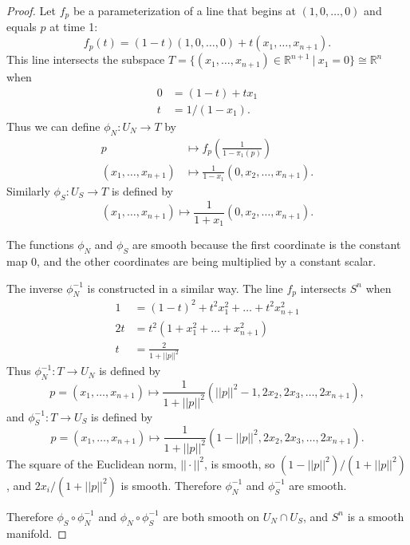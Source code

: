\documentclass{article}
\begin{document}
\begin{proof}
  Let $f_p$ be a parameterization of a line that begins at $(1, 0, \hdots, 0)$ and
  equals $p$ at time 1: \[
    f_p(t) = (1 - t)(1, 0, \hdots, 0) + t(x_1, \hdots, x_{n + 1}).
  \]
  This line intersects the subspace
  $T = \{ (x_1, \hdots, x_{n + 1}) \in \mathbb{R}^{n + 1}\ |\ x_1 = 0\} \cong \mathbb{R}^n$
  when \begin{align*}
    0 &= (1 - t) + tx_1 \\
    t &= 1/(1 - x_1).
  \end{align*}
  Thus we can define $\phi_N: U_N \rightarrow T$ by \begin{align*}
    p &\mapsto f_p\left(\frac{1}{1-\pi_1(p)}\right) \\
    (x_1, \hdots, x_{n + 1}) &\mapsto \frac{1}{1-x_1}(0, x_2, \hdots, x_{n + 1}).
  \end{align*}
  Similarly $\phi_S: U_S \rightarrow T$ is defined by \[
    (x_1, \hdots, x_{n + 1}) \mapsto \frac{1}{1+x_1}(0, x_2, \hdots, x_{n + 1}).
  \]

  The functions $\phi_N$ and $\phi_S$ are smooth because the first coordinate is the
  constant map $0$, and the other coordinates are being multiplied by a constant scalar.

  The inverse $\phi_N^{-1}$ is constructed in a similar way. The line $f_p$
  intersects $S^n$ when \begin{align*}
    1 &= (1 - t)^2 + t^2x_1^2 + \hdots + t^2x_{n + 1}^2 \\
    2t &= t^2(1 + x_1^2 + \hdots + x_{n + 1}^2) \\
    t &= \frac{2}{1 + ||p||^2}
  \end{align*}
  Thus $\phi_N^{-1}: T \rightarrow U_N$ is defined by \[
    p = (x_1, \hdots, x_{n + 1}) \mapsto \frac{1}{1 + ||p||^2}(||p||^2 - 1, 2x_2, 2x_3, \hdots, 2x_{n + 1}),
  \]
  and $\phi_S^{-1}: T \rightarrow U_S$ is defined by \[
    p = (x_1, \hdots, x_{n + 1}) \mapsto \frac{1}{1 + ||p||^2}(1 - ||p||^2, 2x_2, 2x_3, \hdots, 2x_{n + 1}).
  \]
  The square of the Euclidean norm, $||\cdot||^2$, is smooth, so
  $(1 - ||p||^2)/(1 + ||p||^2)$, and $2x_i/(1 + ||p||^2)$ is smooth. Therefore
  $\phi_N^{-1}$ and $\phi_S^{-1}$ are smooth.

  Therefore $\phi_S\circ\phi_N^{-1}$ and $\phi_N\circ\phi_S^{-1}$ are both
  smooth on $U_N \cap U_S$, and $S^n$ is a smooth manifold.
\end{proof}

\pagebreak
\end{document}

